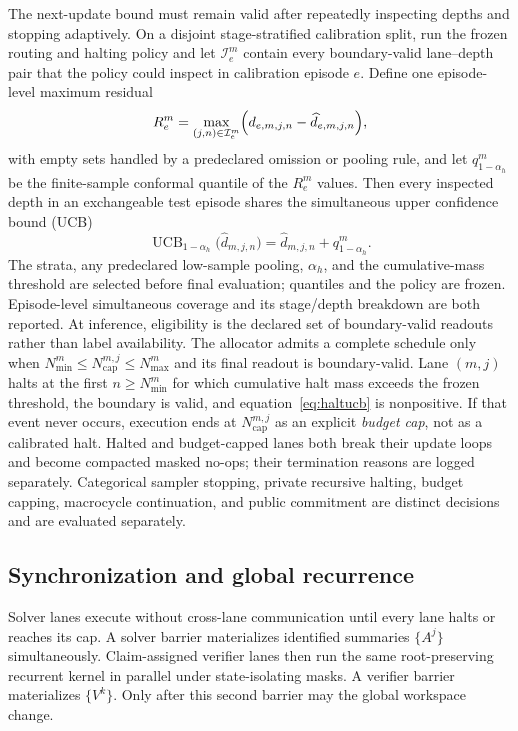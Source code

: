 \documentclass[10pt,a4paper]{article}
\newcommand{\op}[1]{\operatorname{#1}}
\newcommand{\Ical}{\mathcal{I}}
\begin{document}
The next-update bound must remain valid after repeatedly inspecting depths and
stopping adaptively. On a disjoint stage-stratified calibration split, run the
frozen routing and halting policy and let $\Ical^m_e$ contain every
boundary-valid lane--depth pair that the policy could inspect in calibration
episode $e$. Define one episode-level maximum residual
\begin{equation}
R^m_e = \max_{(j,n) \in \Ical^m_e}
  \Bigl( d_{e,m,j,n} - \widehat{d}_{e,m,j,n} \Bigr),
\end{equation}
with empty sets handled by a predeclared omission or pooling rule, and let
$q^m_{1-\alpha_h}$ be the finite-sample conformal quantile of the $R^m_e$
values. Then every inspected depth in an exchangeable test episode shares the
simultaneous upper confidence bound (UCB)
\begin{equation}
\op{UCB}_{1-\alpha_h}\bigl( \widehat{d}_{m,j,n} \bigr)
= \widehat{d}_{m,j,n} + q^m_{1-\alpha_h} .
\label{eq:haltucb}
\end{equation}
The strata, any predeclared low-sample pooling, $\alpha_h$, and the
cumulative-mass threshold are selected before final evaluation; quantiles and
the policy are frozen. Episode-level simultaneous coverage and its stage/depth
breakdown are both reported. At inference, eligibility is the declared set of
boundary-valid readouts rather than label availability. The allocator admits a
complete schedule only when
$N^{m}_{\min} \le N^{m,j}_{\mathrm{cap}} \le N^{m}_{\max}$ and its final
readout is boundary-valid. Lane $(m,j)$ halts at the first $n \ge N^m_{\min}$
for which cumulative halt mass exceeds the frozen threshold, the boundary is
valid, and equation~\eqref{eq:haltucb} is nonpositive. If that event never
occurs, execution ends at $N^{m,j}_{\mathrm{cap}}$ as an explicit \emph{budget
cap}, not as a calibrated halt. Halted and budget-capped lanes both break their
update loops and become compacted masked no-ops; their termination reasons are
logged separately. Categorical sampler stopping, private recursive halting,
budget capping, macrocycle continuation, and public commitment are distinct
decisions and are evaluated separately.

\subsection{Synchronization and global recurrence}

Solver lanes execute without cross-lane communication until every lane halts or
reaches its cap. A solver barrier materializes identified summaries $\{A^j\}$
simultaneously. Claim-assigned verifier lanes then run the same root-preserving
recurrent kernel in parallel under state-isolating masks. A verifier barrier
materializes $\{V^k\}$. Only after this second barrier may the global workspace
change.
\end{document}

